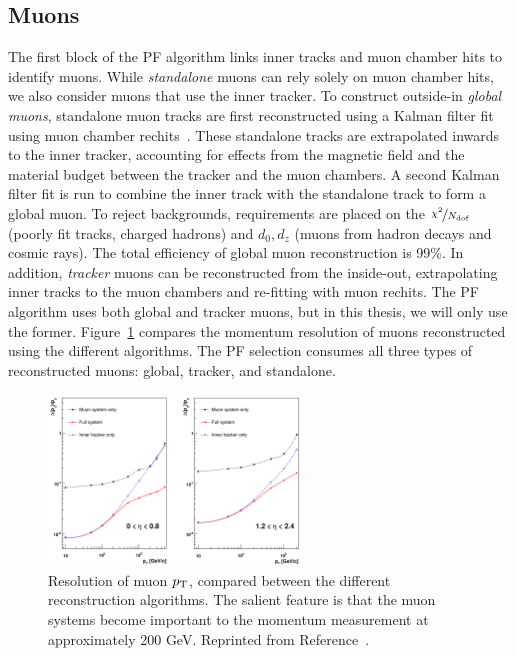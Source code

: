 \subsection{Muons}
\label{sec:cms:muons}

The first block of the PF algorithm links inner tracks and muon chamber hits to identify muons.
While \emph{standalone} muons can rely solely on muon chamber hits, we also consider muons that use the inner tracker.
To construct outside-in \emph{global muons}, standalone muon tracks are first reconstructed using a Kalman filter fit using muon chamber rechits~\cite{cmstdr1,cmsmuon}.
These standalone tracks are extrapolated inwards to the inner tracker, accounting for effects from the magnetic field and the  material budget between the tracker and the muon chambers.
A second Kalman filter fit is run to combine the inner track with the standalone track to form a global muon.
To reject backgrounds, requirements are placed on the $\nicefrac{\chi^2}{N_\mathrm{dof}}$ (poorly fit tracks, charged hadrons) and $d_0,d_z$ (muons from hadron decays and cosmic rays).
The total efficiency of global muon reconstruction is 99\%.
In addition, \emph{tracker} muons can be reconstructed from the inside-out, extrapolating inner tracks to the muon chambers and re-fitting with muon rechits.
The PF algorithm uses both global and tracker muons, but in this thesis, we will only use the former.
Figure~\ref{fig:cms:muonpt} compares the momentum resolution of muons reconstructed using the different algorithms.  
The PF selection consumes all three types of reconstructed muons: global, tracker, and standalone.

\begin{figure}[]
\begin{center}
	\includegraphics[width=0.6\textwidth]{figures/cms/muonpt.png}
	\caption{Resolution of muon $p_\mathrm{T}$, compared between the different reconstruction algorithms. 
			 The salient feature is that the muon systems become important to the momentum measurement at approximately 200 GeV.
			 Reprinted from Reference~\cite{cmsmuon}.}
	\label{fig:cms:muonpt}
\end{center}
\end{figure}


